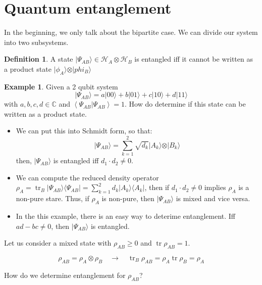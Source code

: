 \documentclass[12pt]{book}
\theoremstyle{definition}
\newtheorem*{defi}{\bfseries Definition}
\newtheorem*{example}{\bfseries Example}
\newcommand{\C}{\mathbb C}
\newcommand{\scalar}[1]{\left\langle {#1}\right\rangle}
\let\oldsum\sum
\renewcommand{\sum}[2]{\oldsum\limits_{#1}^{#2}}
\renewcommand{\to}{\longrightarrow}
\newcommand{\bra}[1]{\langle {#1} \vert}
\newcommand{\ket}[1]{\vert {#1} \rangle}
\DeclareMathOperator{\tr}{tr}
\begin{document}
\section{Quantum entanglement}
In the beginning, we only talk about the bipartite case. We can divide our system into two subsystems.
\begin{defi}
A state $\ket{\Psi_{AB}} \in \mathcal H_A \otimes \mathcal H_B$ is entangled iff it cannot be written as a product state $\ket{\phi_A}\otimes\ket{phi_B}$
\end{defi}
\begin{example}
  Given a 2 qubit system
  \begin{equation*}
    \ket{\Psi_{AB}} = a \ket{00} + b \ket{01} + c \ket{10} + d \ket{11}
  \end{equation*}
  with $a,b,c,d \in \C$ and $\scalar{\Psi_{AB} \vert \Psi_{AB}} = 1$. How do determine if this state can be written as a product state.
  \begin{itemize}
    \item We can put this into Schmidt form, so that:
    \begin{equation*}
      \ket{\Psi_{AB}} = \sum{k=1}{2}\sqrt{d_k} \ket{A_k} \otimes \ket{B_k}
    \end{equation*}
    then, $\ket{\Psi_{AB}}$ is entangled iff $d_1\cdot d_2 \neq 0$.
    \item We can compute the reduced density operator $\rho_A = \tr_B \ket{\Psi_{AB}}\bra{\Psi_{AB}} = \sum{k=1}{2} d_k \ket{A_k} \bra{A_k}$, then if $d_1 \cdot d_2 \neq 0$ implies $\rho_A$ is a non-pure stare. Thus, if $\rho_A$ is non-pure, then $\ket{\Psi_{AB}}$ is mixed and vice versa.
    \item In the this example, there is an easy way to deterime entanglement. Iff $ad-bc \neq 0$, then $\ket{\Psi_{AB}}$ is entangled.
  \end{itemize}
\end{example}

Let us consider a mixed state with $\rho_{AB} \geq 0$ and $\tr \rho_{AB} = 1$.
\begin{tcolorbox}
  \begin{equation}
    \rho_{AB} = \rho_A \otimes \rho_B \quad\to\quad \tr_B \rho_{AB} = \rho_A \tr \rho_B = \rho_A
  \end{equation}
\end{tcolorbox}
How do we determine entanglement for $\rho_{AB}$?
\end{document}
